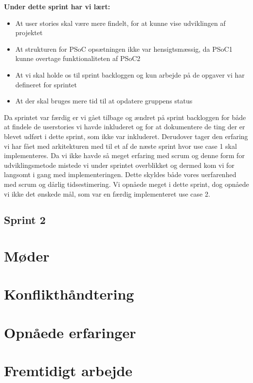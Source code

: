 	\textbf{Under dette sprint har vi lært:}
	\begin{itemize}
		\item At user stories skal være mere findelt, for at kunne vise udviklingen af projektet
		\item At strukturen for PSoC opsætningen ikke var hensigtsmæssig, da PSoC1 kunne overtage funktionaliteten af PSoC2
		\item At vi skal holde os til sprint backloggen og kun arbejde på de opgaver vi har defineret for sprintet
		\item At der skal bruges mere tid til at opdatere gruppens status
	\end{itemize}
	
	Da sprintet var færdig er vi gået tilbage og ændret på sprint backloggen for både at findele de userstories vi havde inkluderet og for at dokumentere de ting der er blevet udført i dette sprint, som ikke var inkluderet. Derudover tager den erfaring vi har fået med arkitekturen med til et af de næste sprint hvor use case 1 skal implementeres. Da vi ikke havde så meget erfaring med scrum og denne form for udviklingsmetode mistede vi under sprintet overblikket og dermed kom vi for langsomt i gang med implementeringen. Dette skyldes både vores uerfarenhed med scrum og dårlig tidsestimering. Vi opnåede meget i dette sprint, dog opnåede vi ikke det ønskede mål, som var en færdig implementeret use case 2. 
	
	
	
	\subsection{Sprint 2}

\section{Møder}

\section{Konflikthåndtering}

\section{Opnåede erfaringer}

\section{Fremtidigt arbejde}